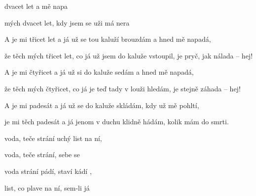

\zr
{}     
\kr

\zs
{} dvacet let a 
   mě napa

 mých dvacet let,
kdy  jsem se uži 
má  nera
\ks

\zr \kr

\zs
A je mi třicet let a já už se
tou kaluží brouzdám a hned mě napadá,

že těch mých třicet let,
co já už jsem do kaluže vstoupil,
je pryč, jak nálada -- hej!
\ks

\zr \kr

\zs
A je mi čtyřicet a já už si
do kaluže sedám a hned mě napadá,

že těch mých čtyřicet,
co já je teď tady v louži hledám,
je stejně záhada -- hej!
\ks

\zr \kr

\zs
A je mi padesát a já už se
do kaluže skládám, kdy už mě pohltí,

je mi těch padesát
a já jenom v duchu klidně hádám,
kolik mám do smrti.
\ks

\zs
{} voda, teče strání
uchý list  na ní,

 voda, teče strání,
 sebe se 

 voda strání pádí,
staví  kádí ,

 list, co plave na ní,
sem-li já 
\ks

\zr \kr

\kp



